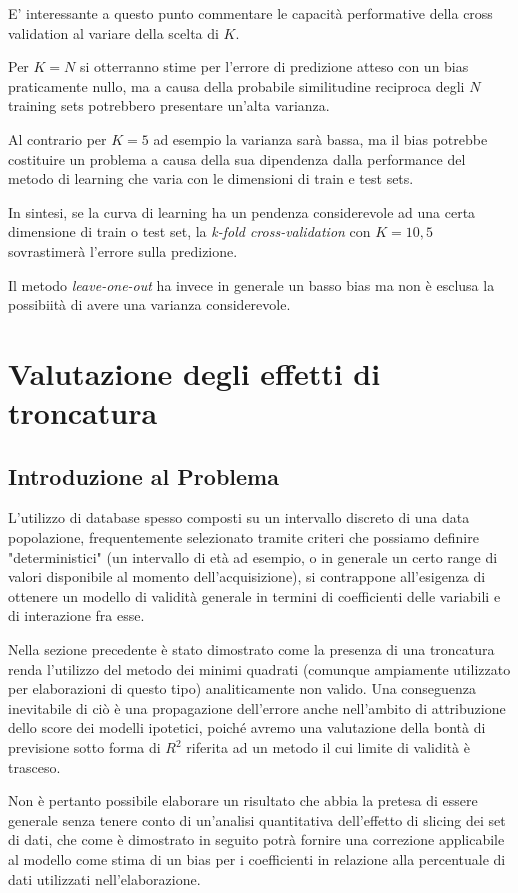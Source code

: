 \documentclass[12pt,openright,twoside,a4paper]{book}
\begin{document}
E' interessante a questo punto commentare le capacità performative della cross validation al variare della scelta di $K$.

Per $K=N$ si otterranno stime per l'errore di predizione atteso con un bias praticamente nullo, ma a causa della probabile similitudine reciproca degli $N$ training sets potrebbero presentare un'alta varianza.

Al contrario per $K=5$ ad esempio la varianza sarà bassa, ma il bias potrebbe costituire un problema a causa della sua dipendenza dalla performance del metodo di learning che varia con le dimensioni di train e test sets.

In sintesi, se la curva di learning ha un pendenza considerevole ad una certa dimensione di train o test set, la \textit{k-fold cross-validation} con $K=10,5$ sovrastimerà l'errore sulla predizione.

Il metodo \textit{leave-one-out} ha invece in generale un basso bias ma non è esclusa la possibiità di avere una varianza considerevole.

\chapter{Valutazione degli effetti di troncatura}

\section{Introduzione al Problema}
L'utilizzo di database spesso composti su un intervallo discreto di una data popolazione, frequentemente selezionato tramite criteri che possiamo definire "deterministici" (un intervallo di età ad esempio, o in generale un certo range di valori disponibile al momento dell'acquisizione), si contrappone all'esigenza di ottenere un modello di validità generale in termini di coefficienti delle variabili e di interazione fra esse.

Nella sezione precedente è stato dimostrato come la presenza di una troncatura renda l'utilizzo del metodo dei minimi quadrati (comunque ampiamente utilizzato per elaborazioni di questo tipo) analiticamente non valido.
Una conseguenza inevitabile di ciò è una propagazione dell'errore anche nell'ambito di attribuzione dello score dei modelli ipotetici, poiché avremo una valutazione della bontà di previsione sotto forma di $R^2$ riferita ad un metodo il cui limite di validità è trasceso.

Non è pertanto possibile elaborare un risultato che abbia la pretesa di essere generale senza tenere conto di un'analisi quantitativa dell'effetto di slicing dei set di dati, che come è dimostrato in seguito potrà fornire una correzione applicabile al modello come stima di un bias per i coefficienti in relazione alla percentuale di dati utilizzati nell'elaborazione.
\end{document}
